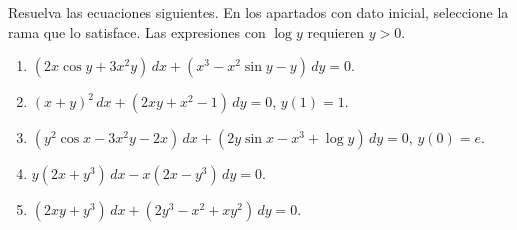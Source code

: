Resuelva las ecuaciones siguientes. En los apartados con dato inicial, seleccione la rama que lo satisface. Las expresiones con $\log y$ requieren $y>0$.

\begin{enumerate}[label=(\alph*),ref=\alph*,leftmargin=*]
\item $(2x\cos y+3x^2y)\,dx+(x^3-x^2\sin y-y)\,dy=0$.
\item $(x+y)^2\,dx+(2xy+x^2-1)\,dy=0$, $y(1)=1$.
\item $(y^2\cos x-3x^2y-2x)\,dx+(2y\sin x-x^3+\log y)\,dy=0$, $y(0)=e$.
\item $y(2x+y^3)\,dx-x(2x-y^3)\,dy=0$.
\item $(2xy+y^3)\,dx+(2y^3-x^2+xy^2)\,dy=0$.
\end{enumerate}
